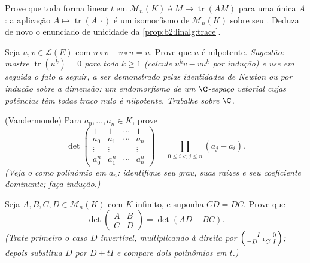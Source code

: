 \begin{exercise}[$\star\star\star$]\label{exo:b2:linalg:9}
Prove que toda forma linear $t$ em $\mathcal{M}_n(K)$ é $M \mapsto
\operatorname{tr}(AM)$ para uma única $A$: a aplicação $A \mapsto
\operatorname{tr}(A\,\cdot)$ é um isomorfismo de
$\mathcal{M}_n(K)$ sobre seu . Deduza de novo o enunciado de unicidade da
\cref{prop:b2:linalg:trace}.
\end{exercise}

\begin{exercise}[$\star\star\star$]\label{exo:b2:linalg:10}
Seja $u, v \in \mathcal{L}(E)$ com $u \circ v - v \circ u = u$.
Prove que $u$ é nilpotente. \emph{Sugestão: mostre
$\operatorname{tr}(u^k) = 0$ para todo $k \geq 1$ (calcule $u^k v -
v u^k$ por indução) e use em seguida o fato a seguir, a ser demonstrado pelas
identidades de Newton ou por indução sobre a dimensão: um
endomorfismo de um $\C$-espaço vetorial cujas potências têm todas traço
nulo é nilpotente. Trabalhe sobre $\C$.}
\end{exercise}

\begin{exercise}[$\star\star$]\label{exo:b2:linalg:11}
(Vandermonde) Para $a_0, \dots, a_n \in K$, prove
\[
\det\begin{pmatrix}
1 & 1 & \cdots & 1\\
a_0 & a_1 & \cdots & a_n\\
\vdots & \vdots & & \vdots\\
a_0^n & a_1^n & \cdots & a_n^n
\end{pmatrix}
= \prod_{0 \leq i < j \leq n} (a_j - a_i).
\]
\emph{(Veja o  como polinômio em $a_n$: identifique seu
grau, suas raízes e seu coeficiente dominante; faça indução.)}
\end{exercise}

\begin{exercise}[$\star\star\star$]\label{exo:b2:linalg:12}
Seja $A, B, C, D \in \mathcal{M}_n(K)$ com $K$ infinito, e
suponha $CD = DC$. Prove que
\[
\det\begin{pmatrix} A & B\\ C & D\end{pmatrix}
= \det(AD - BC).
\]
\emph{(Trate primeiro o caso $D$ invertível, multiplicando à direita por
$\begin{psmallmatrix} I & 0\\ -D^{-1}C & I\end{psmallmatrix}$;
depois substitua $D$ por $D + tI$ e compare dois polinômios em $t$.)}
\end{exercise}

